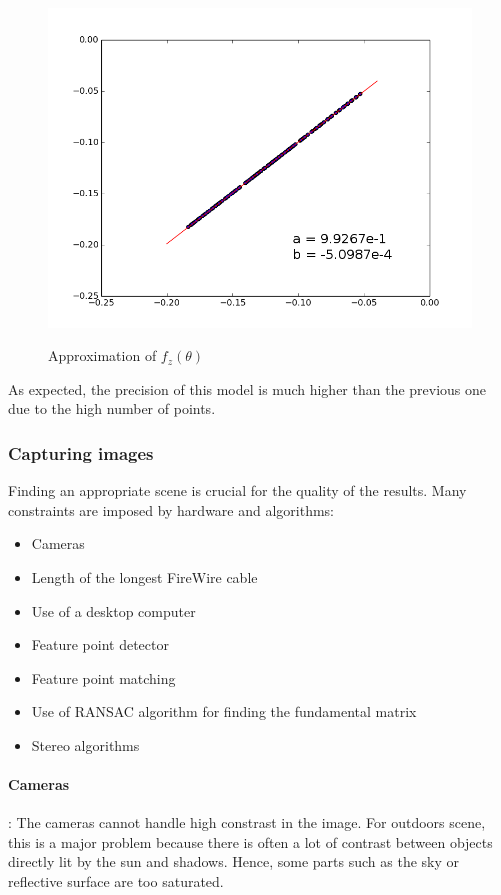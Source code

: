 \documentclass[12pt]{article}
\begin{document}
\begin{figure}[H]
    \begin{center}
        \includegraphics[scale=0.4]{images/newmodelZ.png} 
        \label{fig:newmodelZ}
        \caption{Approximation of $f_z(\theta)$}
    \end{center}
\end{figure}

As expected, the precision of this model is much higher than the previous one due to the high number of points.

\subsubsection{Capturing images}

Finding an appropriate scene is crucial for the quality of the results. Many constraints are imposed by hardware and algorithms:
\begin{itemize}
    \item Cameras
    \item Length of the longest FireWire cable
    \item Use of a desktop computer
    \item Feature point detector
    \item Feature point matching
    \item Use of RANSAC algorithm for finding the fundamental matrix
    \item Stereo algorithms
\end{itemize}

\paragraph{Cameras}: The cameras cannot handle high constrast in the image. For outdoors scene, this is a major problem because there is often a lot of contrast between objects directly lit by the sun and shadows. Hence, some parts such as the sky or reflective surface are too saturated. 
\end{document}
